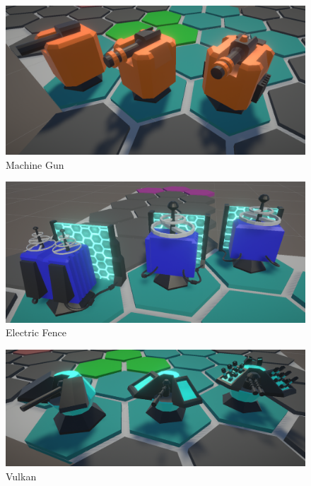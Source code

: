 \documentclass[12pt, a4paper]{article}
\begin{document}
	
	\begin{figure}[H]
		\centering
		\includegraphics[width=1\textwidth]{machineGun.png}
		\caption{Machine Gun}
		\label{fig: machineGun}
	\end{figure}

	\begin{figure}[H]
		\centering
		\includegraphics[width=1\textwidth]{electricFence.png}
		\caption{Electric Fence}
		\label{fig: electricFence}
	\end{figure}

	\begin{figure}[H]
		\centering
		\includegraphics[width=1\textwidth]{vulkan.png}
		\caption{Vulkan}
		\label{fig: vulkan}
	\end{figure}
\end{document}
